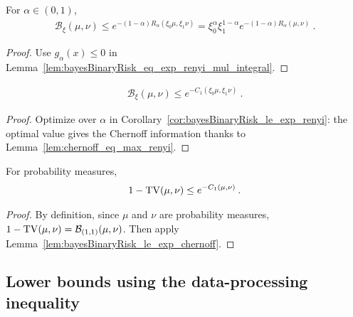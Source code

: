 \begin{corollary}
  \label{cor:bayesBinaryRisk_le_exp_renyi}
  For $\alpha \in (0,1)$,
  \begin{align*}
  \mathcal B_\xi(\mu, \nu)
  \le e^{-(1 - \alpha) R_\alpha(\xi_0\mu, \xi_1\nu)}
  = \xi_0^\alpha \xi_1^{1-\alpha} e^{-(1 - \alpha) R_\alpha(\mu, \nu)}
  \: .
  \end{align*}
\end{corollary}

\begin{proof}%
{}
Use $g_\alpha(x) \le 0$ in Lemma~\ref{lem:bayesBinaryRisk_eq_exp_renyi_mul_integral}.
\end{proof}


\begin{lemma}
  \label{lem:bayesBinaryRisk_le_exp_chernoff}
  \begin{align*}
  \mathcal B_\xi(\mu, \nu)
  \le e^{- C_1(\xi_0\mu, \xi_1\nu)}
  \: .
  \end{align*}
\end{lemma}

\begin{proof}%
{}
Optimize over $\alpha$ in Corollary~\ref{cor:bayesBinaryRisk_le_exp_renyi}: the optimal value gives the Chernoff information thanks to Lemma~\ref{lem:chernoff_eq_max_renyi}.
\end{proof}


\begin{lemma}
  \label{lem:one_sub_tv_le_exp_chernoff}
  For probability measures,
  \begin{align*}
  1 - \operatorname{TV}(\mu, \nu) \le e^{- C_1(\mu, \nu)} \: .
  \end{align*}
\end{lemma}

\begin{proof}%
{}
By definition, since $\mu$ and $\nu$ are probability measures, $1 - \operatorname{TV}(\mu, \nu) = \mathcal B_{(1,1)}(\mu, \nu)$. Then apply Lemma~\ref{lem:bayesBinaryRisk_le_exp_chernoff}.
\end{proof}



\subsection{Lower bounds using the data-processing inequality}

